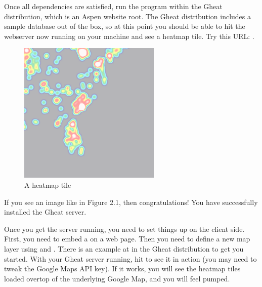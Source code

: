 \documentclass{manual}
\begin{document}
Once all dependencies are satisfied, run the  program within the
Gheat distribution, which is an Aspen website root. The Gheat distribution
includes a sample database out of the box, so at this point you should be able
to hit the webserver now running on your machine and see a heatmap tile. Try
this URL:
.

\begin{figure}[htp]
\includegraphics[bb=0 0 256 256]{img/4,6.png}
\caption{A heatmap tile}\label{fig:tile}
\end{figure}

If you see an image like in Figure 2.1, then congratulations! You have
successfully installed the Gheat server.

Once you get the server running, you need to set things up on the client side.
First, you need to embed a  on a web page. Then you need to define
a new map layer using
and
.
There is an example at  in the Gheat distribution to get you
started. With your Gheat server running, hit
to see it in action (you may need to tweak the Google Maps API key). If it
works, you will see the heatmap tiles loaded overtop of the underlying Google
Map, and you will feel pumped.

\begin{seealso}
\end{seealso}
\end{document}
